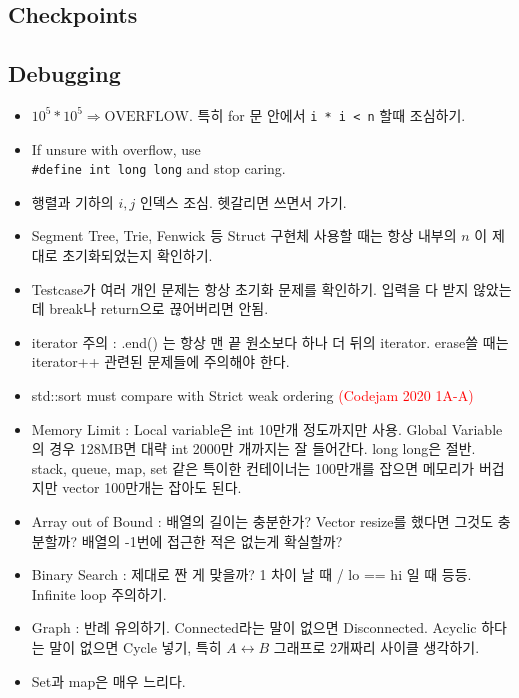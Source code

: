 \documentclass[landscape,8pt]{article}
\begin{document}
\begin{multicols}{2}
\newpage
\section{Checkpoints}
  \subsection{Debugging}
\begin{itemize}
  \item $10^5 * 10^5 \Rightarrow \text{OVERFLOW}$. 특히 for 문 안에서 \texttt{i * i < n} 할때 조심하기.
  \item If unsure with overflow, use \\
  \texttt{\#define int long long} and stop caring.
  \item 행렬과 기하의 $i, j$ 인덱스 조심. 헷갈리면 쓰면서 가기.
  \item Segment Tree, Trie, Fenwick 등 Struct 구현체 사용할 때는 항상 내부의 $n$ 이 제대로 초기화되었는지 확인하기.
  \item Testcase가 여러 개인 문제는 항상 초기화 문제를 확인하기. 입력을 다 받지 않았는데 break나 return으로 끊어버리면 안됨.
  \item iterator 주의 : .end() 는 항상 맨 끝 원소보다 하나 더 뒤의 iterator. erase쓸 때는 iterator++ 관련된 문제들에 주의해야 한다.
  \item std::sort must compare with Strict weak ordering \textcolor{red}{(Codejam 2020 1A-A)}
  \item Memory Limit : Local variable은 int 10만개 정도까지만 사용. Global Variable의 경우 128MB면 대략 int 2000만 개까지는 잘 들어간다. long long은 절반. stack, queue, map, set 같은 특이한 컨테이너는 100만개를 잡으면 메모리가 버겁지만 vector 100만개는 잡아도 된다.
  \item Array out of Bound : 배열의 길이는 충분한가? Vector resize를 했다면 그것도 충분할까? 배열의 -1번에 접근한 적은 없는게 확실할까?
  \item Binary Search : 제대로 짠 게 맞을까? 1 차이 날 때 / lo == hi 일 때 등등. Infinite loop 주의하기.
  \item Graph : 반례 유의하기. Connected라는 말이 없으면 Disconnected. Acyclic 하다는 말이 없으면 Cycle 넣기, 특히 $A \leftrightarrow B$ 그래프로 2개짜리 사이클 생각하기.
  \item Set과 map은 매우 느리다.
\end{itemize}

\end{multicols}
\end{document}
